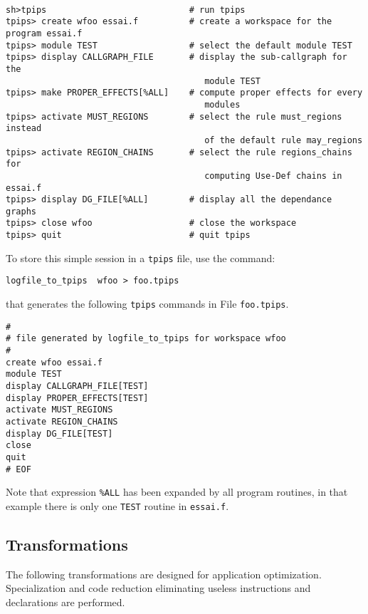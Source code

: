 \documentclass[a4paper,12pt]{article}
\begin{document}
\begin{verbatim}

sh>tpips                            # run tpips
tpips> create wfoo essai.f          # create a workspace for the program essai.f
tpips> module TEST                  # select the default module TEST
tpips> display CALLGRAPH_FILE       # display the sub-callgraph for the
                                       module TEST
tpips> make PROPER_EFFECTS[%ALL]    # compute proper effects for every
                                       modules
tpips> activate MUST_REGIONS        # select the rule must_regions instead
                                       of the default rule may_regions
tpips> activate REGION_CHAINS       # select the rule regions_chains for
                                       computing Use-Def chains in essai.f
tpips> display DG_FILE[%ALL]        # display all the dependance graphs
tpips> close wfoo                   # close the workspace
tpips> quit                         # quit tpips
\end{verbatim}

To store this simple session in a {\tt tpips} file, use the command:

\verb+logfile_to_tpips  wfoo > foo.tpips+

that generates the following {\tt tpips} commands  in File  \verb+foo.tpips+. 

\begin{verbatim}
#
# file generated by logfile_to_tpips for workspace wfoo
#
create wfoo essai.f
module TEST
display CALLGRAPH_FILE[TEST]
display PROPER_EFFECTS[TEST]
activate MUST_REGIONS
activate REGION_CHAINS
display DG_FILE[TEST]
close
quit
# EOF
\end{verbatim}


Note that  expression  \verb+%ALL+ has been expanded by all
program routines, in that example there is only one \verb+TEST+
routine in \verb+essai.f+.

\subsection{Transformations}
\label{exm3}

The following transformations are designed for application optimization.
Specialization and code reduction eliminating useless instructions and
declarations are performed.
\end{document}
